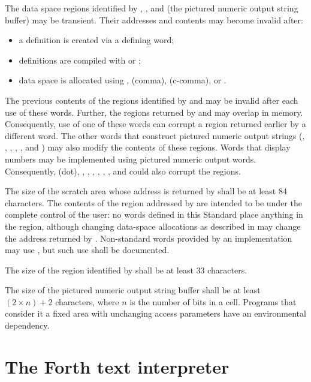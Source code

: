 The data space regions identified by , , and
 (the pictured numeric output string buffer) may be
transient. Their addresses and contents may become invalid after:

\begin{itemize}
\item a definition is created via a defining word;
\item definitions are compiled with \word{:} or ;
\item data space is allocated using , \word{,} (comma),
	 (c-comma), or .
\end{itemize}

The previous contents of the regions identified by  and
 may be invalid after each use of these words. Further,
the regions returned by  and  may overlap in
memory. Consequently, use of one of these words can corrupt a region
returned earlier by a different word. The other words that construct
pictured numeric output strings (, , ,
, , and )  may also modify
the contents of these regions. Words that display numbers may be
implemented using pictured numeric output words. Consequently, 
(dot), , , , ,
, , and  could also corrupt the
regions.

The size of the scratch area whose address is returned by 
shall be at least 84 characters. The contents of the region
addressed by  are intended to be under the complete
control of the user: no words defined in this Standard place
anything in the region, although changing data-space allocations as
described in  may change
the address returned by . Non-standard words provided by
an implementation may use , but such use shall be
documented.

The size of the region identified by  shall be at least
33 characters.

The size of the pictured numeric output string buffer shall be at
least $(2 \times n) + 2 $ characters, where $n$ is the number of
bits in a cell. Programs that consider it a fixed area with
unchanging access parameters have an environmental dependency.

\section{The Forth text interpreter} %
\label{usage:command}

